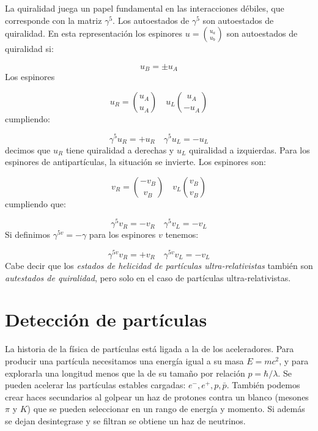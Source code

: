 La quiralidad juega un papel fundamental en las interacciones débiles, que corresponde con la matriz $\gamma^5$. Los autoestados de $\gamma^5$ son autoestados de quiralidad. En esta representación los espinores $u=\binom{u_a}{u_b}$ son autoestados de quiralidad si:

\begin{equation}
	u_B = \pm u_A
\end{equation}
Los espinores 

\begin{equation}
	u_R = \binom{u_A}{u_A} \quad u_L \binom{u_A}{-u_A}
\end{equation}
cumpliendo:

\begin{equation}
	\gamma^5 u_R = + u_R \quad \gamma^5 u_L = - u_L
\end{equation}
decimos que $u_R$ tiene quiralidad a derechas y $u_L$ quiralidad a izquierdas. Para los espinores de antipartículas, la situación se invierte. Los espinores son:

\begin{equation}
	v_R = \binom{-v_B}{v_B} \quad v_L \binom{v_B}{v_B}
\end{equation}
cumpliendo que:

\begin{equation}
	\gamma^5 v_R = - v_R \quad \gamma^5 v_L = - v_L
\end{equation}
Si definimos $\gamma^{5v}=-\gamma$ para los espinores $v$ tenemos:

\begin{equation}
	\gamma^{5v} v_R = + v_R \quad \gamma^{5v} v_L = - v_L
\end{equation}
Cabe decir que los \textit{estados de helicidad de partículas ultra-relativistas} también son \textit{autestados de quiralidad}, pero solo en el caso de partículas ultra-relativistas.




\section{Detección de partículas}

La historia de la física de partículas está ligada a la de los aceleradores. Para producir una partícula necesitamos una energía igual a su masa $E=mc^2$, y para explorarla una longitud menos que la de su tamaño por relación $p=\hbar/\lambda$. Se pueden acelerar las partículas estables cargadas: $e^-,e^+,p,\bar{p}$. También podemos crear haces secundarios al golpear un haz de protones contra un blanco (mesones $\pi$ y $K$) que se pueden seleccionar en un rango de energía y momento. Si además se dejan desintegrase y se filtran se obtiene un haz de neutrinos.

